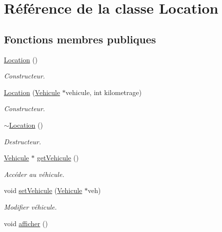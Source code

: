 \hypertarget{class_location}{
\section{Référence de la classe Location}
\label{class_location}
}
\subsection*{Fonctions membres publiques}
\begin{DoxyCompactItemize}
\item 
\hyperlink{class_location_a87790c14997fd8cdd12080c78c9794bb}{Location} ()
\begin{DoxyCompactList}\small\item\em Constructeur. \item\end{DoxyCompactList}\item 
\hyperlink{class_location_a104db0410ddd4543691f3c5c4514af7a}{Location} (\hyperlink{class_vehicule}{Vehicule} $\ast$vehicule, int kilometrage)
\begin{DoxyCompactList}\small\item\em Constructeur. \item\end{DoxyCompactList}\item 
\hyperlink{class_location_af5be2c6550bbd96137cbb3144ec3c529}{$\sim$Location} ()
\begin{DoxyCompactList}\small\item\em Destructeur. \item\end{DoxyCompactList}\item 
\hyperlink{class_vehicule}{Vehicule} $\ast$ \hyperlink{class_location_a3f130f10a4a558d6b792b1e538e9fb40}{getVehicule} ()
\begin{DoxyCompactList}\small\item\em Accéder au véhicule. \item\end{DoxyCompactList}\item 
void \hyperlink{class_location_a66eaf6883a88c65a6281ccf111db3c03}{setVehicule} (\hyperlink{class_vehicule}{Vehicule} $\ast$veh)
\begin{DoxyCompactList}\small\item\em Modifier véhicule. \item\end{DoxyCompactList}\item 
void \hyperlink{class_location_ad7dadc3847da51c3c012f0647f011706}{afficher} ()

\end{DoxyCompactItemize}
